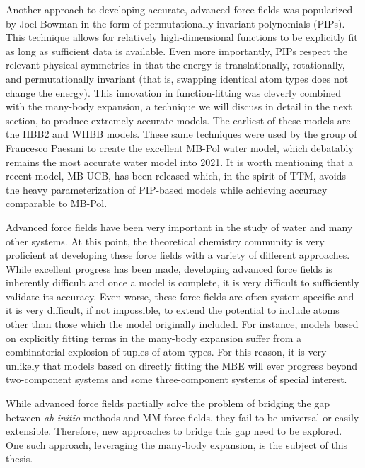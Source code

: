 \documentclass[11pt, proquest]{uwthesis}[2020/02/24]
\begin{document}
\par Another approach to developing accurate, advanced force fields was popularized by Joel Bowman in the form of permutationally invariant polynomials (PIPs)\autocite{braams_permutationally_2009}. This technique allows for relatively high-dimensional functions to be explicitly fit as long as sufficient data is available. Even more importantly, PIPs respect the relevant physical symmetries in that the energy is translationally, rotationally, and permutationally invariant (that is, swapping identical atom types does not change the energy). This innovation in function-fitting was cleverly combined with the many-body expansion, a technique we will discuss in detail in the next section, to produce extremely accurate models. The earliest of these models are the HBB2\autocite{huang_ab_2006} and WHBB\autocite{wang_full-dimensional_2009} models. These same techniques were used by the group of Francesco Paesani to create the excellent MB-Pol water model\autocite{babin_toward_2012, babin_development_2013, babin_development_2013-1, babin_development_2014}, which debatably remains the most accurate water model into 2021. It is worth mentioning that a recent model, MB-UCB\autocite{das_development_2019}, has been released which, in the spirit of TTM, avoids the heavy parameterization of PIP-based models while achieving accuracy comparable to MB-Pol.

\par Advanced force fields have been very important in the study of water and many other systems. At this point, the theoretical chemistry community is very proficient at developing these force fields with a variety of different approaches. While excellent progress has been made, developing advanced force fields is inherently difficult and once a model is complete, it is very difficult to sufficiently validate its accuracy. Even worse, these force fields are often system-specific and it is very difficult, if not impossible, to extend the potential to include atoms other than those which the model originally included. For instance, models based on explicitly fitting terms in the many-body expansion suffer from a combinatorial explosion of tuples of atom-types. For this reason, it is very unlikely that models based on directly fitting the MBE will ever progress beyond two-component systems and some three-component systems of special interest.

\par While advanced force fields partially solve the problem of bridging the gap between \textit{ab initio} methods and MM force fields, they fail to be universal or easily extensible. Therefore, new approaches to bridge this gap need to be explored. One such approach, leveraging the many-body expansion, is the subject of this thesis.
\end{document}
